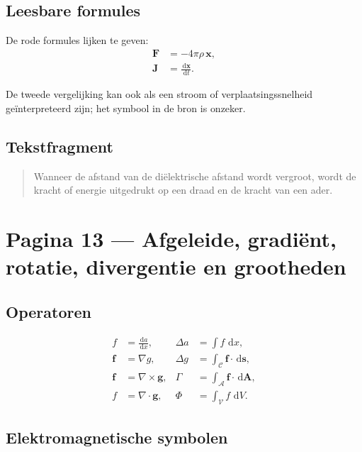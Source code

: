\documentclass[11pt]{article}
\newcommand{\dd}{\,\mathrm{d}}
\newcommand{\vect}[1]{\mathbf{#1}}
\newcommand{\onzeker}[1]{\textcolor{red!70!black}{#1}}
\begin{document}
\subsection*{Leesbare formules}

De rode formules lijken te geven:
\begin{align*}
\vect{F}
  &=
  -4\pi\rho\,\vect{x},
\\
\vect{J}
  &=
  \frac{\dd \vect{x}}{\dd t}.
\end{align*}

De tweede vergelijking kan ook als een stroom of verplaatsingssnelheid geïnterpreteerd zijn; het symbool in de bron is \onzeker{onzeker}.

\subsection*{Tekstfragment}

\begin{quote}
Wanneer de afstand van de diëlektrische \onzeker{afstand} wordt vergroot, wordt de kracht of energie uitgedrukt op een draad en de kracht van een \onzeker{ader}.
\end{quote}

\section*{Pagina 13 --- Afgeleide, gradiënt, rotatie, divergentie en grootheden}

\subsection*{Operatoren}

\begin{align*}
f
  &=
  \frac{\dd a}{\dd x},
  &
  \Delta a
  &=
  \int f\,\dd x,
\\
\vect{f}
  &=
  \nabla g,
  &
  \Delta g
  &=
  \int_{\mathcal{C}}\vect{f}\cdot\dd\vect{s},
\\
\vect{f}
  &=
  \nabla\times\vect{g},
  &
  \Gamma
  &=
  \int_{\mathcal{A}}\vect{f}\cdot\dd\vect{A},
\\
f
  &=
  \nabla\cdot\vect{g},
  &
  \Phi
  &=
  \int_{\mathcal{V}} f\,\dd V.
\end{align*}

\subsection*{Elektromagnetische symbolen}
\end{document}
